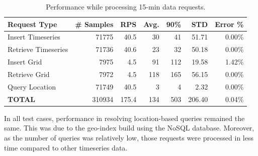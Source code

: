 \documentclass[conference]{IEEEtran}
\begin{document}
\begin{table}[tb!]
\caption{Performance while processing 15-min data requests.}
\begin{center}
\begin{adjustbox}{width=0.45\textwidth}
\begin{tabular}{|l|r|r|r|r|r|r|}
\hline
\textbf{Request Type} & \textbf{\# Samples} & \textbf{RPS} & \textbf{Avg.} & \textbf{90\%} & \textbf{STD} & \textbf{Error \%} \\ \hline
Insert Timeseries & 71775 & 40.5 & 30 & 41 & 51.71 & 0.00\% \\ \hline
Retrieve Timeseries & 71736 & 40.6 & 23 & 32 & 50.18 & 0.00\% \\ \hline
Insert Grid & 7975 & 4.5 & 91 & 112 & 19.58 & 1.42\% \\ \hline
Retrieve Grid & 7972 & 4.5 & 118 & 165 & 56.15 & 0.00\% \\ \hline
Query Location & 71749 & 40.5 & 3 & 4 & 2.32 & 0.00\% \\ \hline
\textbf{TOTAL} & 310934 & 175.4 & 134 & 503 & 206.40 & 0.04\% \\ \hline
\end{tabular}
\end{adjustbox}
\label{ptab:obs_all_15_min_summary_throughput}
\end{center}
\end{table}

In all test cases, performance in resolving location-based queries remained the same. This was due to the geo-index build using the NoSQL database. Moreover, as the number of queries was relatively low, those requests were processed in less time compared to other timeseries data.
\end{document}
